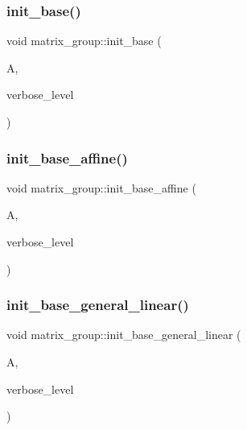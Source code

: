 \mbox{\label{classmatrix__group_a2b7f41b5e6f58257532c1e24312b89e2}} 
\subsubsection{\texorpdfstring{init\+\_\+base()}{init\_base()}}
{\footnotesize\ttfamily void matrix\+\_\+group\+::init\+\_\+base (\begin{DoxyParamCaption}\item[{\mbox{\hyperlink{classaction}{action}} $\ast$}]{A,  }\item[{\mbox{\hyperlink{galois_8h_a09fddde158a3a20bd2dcadb609de11dc}{I\+NT}}}]{verbose\+\_\+level }\end{DoxyParamCaption})}

\mbox{\label{classmatrix__group_a2210282843acc1347ea2a32620b8989a}} 
\subsubsection{\texorpdfstring{init\+\_\+base\+\_\+affine()}{init\_base\_affine()}}
{\footnotesize\ttfamily void matrix\+\_\+group\+::init\+\_\+base\+\_\+affine (\begin{DoxyParamCaption}\item[{\mbox{\hyperlink{classaction}{action}} $\ast$}]{A,  }\item[{\mbox{\hyperlink{galois_8h_a09fddde158a3a20bd2dcadb609de11dc}{I\+NT}}}]{verbose\+\_\+level }\end{DoxyParamCaption})}

\mbox{\label{classmatrix__group_af2d84056c46dafaed6ecb1edc2463c19}} 
\subsubsection{\texorpdfstring{init\+\_\+base\+\_\+general\+\_\+linear()}{init\_base\_general\_linear()}}
{\footnotesize\ttfamily void matrix\+\_\+group\+::init\+\_\+base\+\_\+general\+\_\+linear (\begin{DoxyParamCaption}\item[{\mbox{\hyperlink{classaction}{action}} $\ast$}]{A,  }\item[{\mbox{\hyperlink{galois_8h_a09fddde158a3a20bd2dcadb609de11dc}{I\+NT}}}]{verbose\+\_\+level }\end{DoxyParamCaption})}

